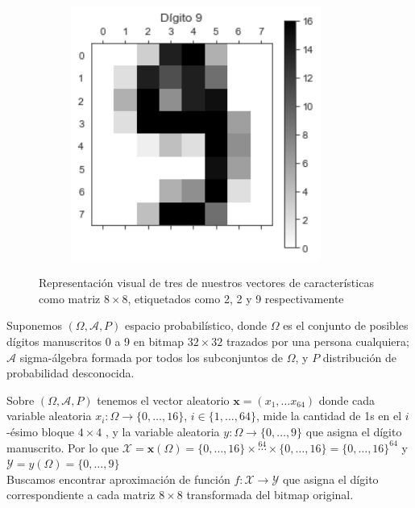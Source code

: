 \documentclass[11pt,a4paper]{article}
\theoremstyle{definition}
\begin{document}
\begin{figure}[H]
\begin{subfigure}{.33\textwidth}
  		\label{fig:sub2}
		\end{subfigure}
		\begin{subfigure}{.33\textwidth}
  		\centering
  		\includegraphics[width=0.9\textwidth]{images/dig9}
  		\label{fig:sub2}
		\end{subfigure}
		\caption{Representación visual de tres de nuestros vectores de características como matriz $8\times 8$, etiquetados como 2, 2 y 9 respectivamente}
		\label{fig:test}
	\end{figure}
	
	Suponemos $(\Omega, \mathcal{A}, P)$ espacio probabilístico, donde $\Omega$ es el conjunto de posibles dígitos manuscritos 0 a 9 en bitmap $32\times 32$ trazados por una persona cualquiera; $\mathcal{A}$ sigma-álgebra formada por todos los subconjuntos de $\Omega$, y $P$ distribución de probabilidad desconocida.
	
	Sobre $(\Omega, \mathcal{A}, P)$ tenemos el vector aleatorio $\mathbf{x}=(x_1,\ldots x_{64})$ donde cada variable aleatoria $x_i\colon \Omega \to \{0,\ldots ,16\}$, $i\in \{1,\ldots,64\}$, mide la cantidad de 1s en el $i$-ésimo bloque $4\times 4$ , y la variable aleatoria $y\colon \Omega \to \{0,\ldots, 9\}$ que asigna el dígito manuscrito. Por lo que $\mathcal{X}=\mathbf{x}(\Omega)=\{0,\ldots ,16\} \times \stackrel{64}{\cdots} \times \{0,\ldots ,16\} = \{0,\ldots ,16\}^{64}$ y $\mathcal{Y}=y(\Omega)=\{0,\ldots,9\}$\\ Buscamos encontrar aproximación de función $f\colon \mathcal{X} \to \mathcal{Y}$ que asigna el dígito correspondiente a cada matriz $8\times 8$ transformada del bitmap original.
	
\end{document}
